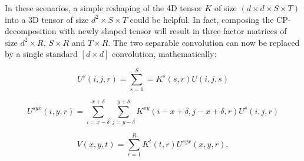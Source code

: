 In these scenarios, a simple reshaping of the 4D tensor $K$ of size $(d \times d \times S \times T)$ into a 3D tensor of size $d^2 \times S \times T$ could be helpful. In fact, composing the CP-decomposition with newly shaped tensor will result in three factor matrices of size $d^2 \times R$, $S \times R$ and $T \times R$. The two separable convolution can now be replaced by a single standard $[d \times d]$ convolution, mathematically: 

\begin{equation}
\label{eq:cpd1}
    U^s(i,j,r) =\sum^{S}_{s=1}=K^s(s,r)U(i,j,s)    
\end{equation}

\begin{equation}
    U^{syx}(i,y,r) = \sum_{i=x-\delta}^{x + \delta} \sum_{j=y-\delta}^{y+\delta} K^{xy} (i-x+\delta, j-x + \delta,r)U^{s}(i,j,r)
\end{equation}

\begin{equation}
    V(x,y,t) = \sum_{r=1}^R K^t (t,r) U^{syx}(x,y,r),
\end{equation}

